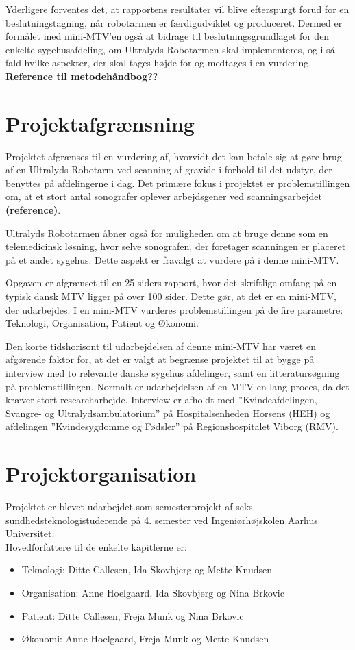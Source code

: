 Yderligere forventes det, at rapportens resultater vil blive efterspurgt forud for en beslutningstagning, når robotarmen er færdigudviklet og produceret. Dermed er formålet med mini-MTV’en også at bidrage til beslutningsgrundlaget for den enkelte sygehusafdeling, om Ultralyds Robotarmen skal implementeres, og i så fald hvilke aspekter, der skal tages højde for og medtages i en vurdering. \textbf{Reference til metodehåndbog??}

\section{Projektafgrænsning}
Projektet afgrænses til en vurdering af, hvorvidt det kan betale sig at gøre brug af en Ultralyds Robotarm ved scanning af gravide i forhold til det udstyr, der benyttes på afdelingerne i dag. Det primære fokus i projektet er problemstillingen om, at et stort antal sonografer oplever arbejdsgener ved scanningsarbejdet \textbf{(reference)}. 

Ultralyds Robotarmen åbner også for muligheden om at bruge denne som en telemedicinsk løsning, hvor selve sonografen, der foretager scanningen er placeret på et andet sygehus. Dette aspekt er fravalgt at vurdere på i denne mini-MTV. 

Opgaven er afgrænset til en 25 siders rapport, hvor det skriftlige omfang på en typisk dansk MTV ligger på over 100 sider. Dette gør, at det er en mini-MTV, der udarbejdes. I en mini-MTV vurderes problemstillingen på de fire parametre: Teknologi, Organisation, Patient og Økonomi. 

Den korte tidshorisont til udarbejdelsen af denne mini-MTV har været en afgørende faktor for, at det er valgt at begrænse projektet til at bygge på interview med to relevante danske sygehus afdelinger, samt en litteratursøgning på problemstillingen. Normalt er udarbejdelsen af en MTV en lang proces, da det kræver stort researcharbejde. Interview er afholdt med ”Kvindeafdelingen, Svangre- og Ultralydsambulatorium” på Hospitalsenheden Horsens (HEH) og afdelingen ”Kvindesygdomme og Fødsler” på Regionshospitalet Viborg (RMV).

\section{Projektorganisation}
Projektet er blevet udarbejdet som semesterprojekt af seks sundhedsteknologistuderende på 4. semester ved Ingeniørhøjskolen Aarhus Universitet. \\
Hovedforfattere til de enkelte kapitlerne er:
\begin{itemize}
\item Teknologi: Ditte Callesen, Ida Skovbjerg og  Mette Knudsen
\item Organisation: Anne Hoelgaard, Ida Skovbjerg og Nina Brkovic
\item Patient: Ditte Callesen, Freja Munk og Nina Brkovic
\item Økonomi: Anne Hoelgaard, Freja Munk og Mette Knudsen
\end{itemize}

\label{version_Systemark}
